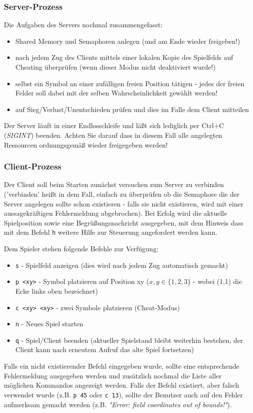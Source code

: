 \subsubsection*{Server-Prozess}
Die Aufgaben des Servers nochmal zusammengefasst:
\begin{itemize}
\item Shared Memory und Semaphoren anlegen (und am Ende wieder freigeben!)
\item nach jedem Zug des Clients mittels einer lokalen Kopie des Spielfelds auf Cheating überprüfen (wenn
  dieser Modus nicht deaktiviert wurde!)
\item selbst ein Symbol an einer zufälligen freien Position tätigen - jedes der freien Felder soll dabei
      mit der selben Wahrscheinlichkeit gewählt werden!
\item auf Sieg/Verlust/Unentschieden prüfen und dies im Falle dem Client mitteilen
\end{itemize}
Der Server läuft in einer Endlosschleife und läßt sich lediglich per
Ctrl+C (\textit{SIGINT}) beenden. Achten Sie darauf dass in diesem Fall
alle angelegten Ressourcen ordnungsgemäß wieder freigegeben werden!

\subsubsection*{Client-Prozess}
Der Client soll beim Starten zunächst versuchen zum Server zu verbinden
('verbinden' heißt in dem Fall, einfach zu überprüfen ob die Semaphore
die der Server angelegen sollte schon existieren - falls sie nicht existieren,
wird mit einer aussagekräftigen Fehlermeldung abgebrochen). Bei Erfolg wird die aktuelle
Spielposition sowie eine
Begrüßungsnachricht ausgegeben, mit dem Hinweis dass mit dem Befehl \texttt{h}
weitere Hilfe zur Steuerung angefordert werden kann.

Dem Spieler stehen folgende Befehle zur Verfügung:
\begin{itemize}
	\item \texttt{s} - Spielfeld anzeigen (dies wird nach jedem Zug automatisch gemacht)
	\item \texttt{p <xy>} - Symbol platzieren auf Position xy ($ x,y \in \{1,2,3\} $ - wobei (1,1) die Ecke links oben bezeichnet)
	\item \texttt{c <xy> <xy>} - zwei Symbole platzieren (Cheat-Modus)
	\item \texttt{n} - Neues Spiel starten
	\item \texttt{q} - Spiel/Client beenden (aktueller Spielstand bleibt weiterhin bestehen, der Client kann nach erneutem Aufruf das alte Spiel fortsetzen)
\end{itemize}
Falls ein nicht existierender Befehl eingegeben wurde, sollte eine entsprechende
Fehlermeldung ausgegeben werden und zusätzlich nochmal die Liste aller möglichen
Kommandos angezeigt werden. Falls der Befehl existiert, aber falsch verwendet wurde
(z.B. \texttt{p 45} oder \texttt{c 13}), sollte der Benutzer auch auf den Fehler
aufmerksam gemacht werden (z.B. \textit{"Error: field coordinates out of bounds!"}).

